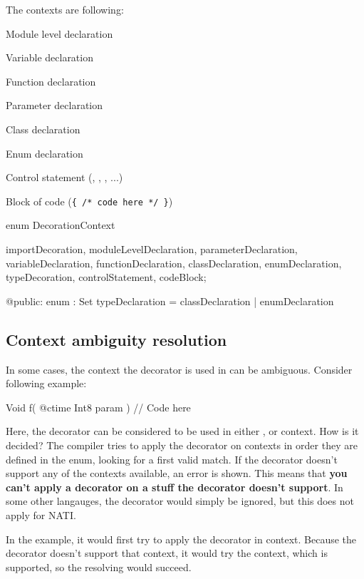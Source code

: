 The contexts are following:
\begin{compactitem}
	\item Module level declaration
	\item Variable declaration
	\item Function declaration
	\item Parameter declaration
	\item Class declaration
	\item Enum declaration
	\item Control statement (, , , ...)
	\item Block of code (\verb|{ /* code here */ }|)
\end{compactitem}

\begin{code}
enum DecorationContext {
	importDecoration,
	moduleLevelDeclaration,
	parameterDeclaration,
	variableDeclaration,
	functionDeclaration,
	classDeclaration,
	enumDeclaration,
	typeDecoration,
	controlStatement,
	codeBlock;
	
@public:
	enum : Set {
		typeDeclaration = classDeclaration | enumDeclaration	
	}
}
\end{code} \label{enum:DecorationContext}

\subsection{Context ambiguity resolution} In some cases, the context the decorator is used in can be ambiguous. Consider following example:
\begin{code}
Void f( @ctime Int8 param ) {
	// Code here
}
\end{code}

Here, the  decorator can be considered to be used in either ,  or  context. How is it decided? The compiler tries to apply the decorator on contexts in order they are defined in the  enum, looking for a first valid match. If the decorator doesn't support any of the contexts available, an error is shown. This means that \textbf{you can't apply a decorator on a stuff the decorator doesn't support}. In some other langauges, the decorator would simply be ignored, but this does not apply for NATI.

In the example, it would first try to apply the decorator in   context. Because the  decorator doesn't support that context, it would try the   context, which is supported, so the resolving would succeed.

